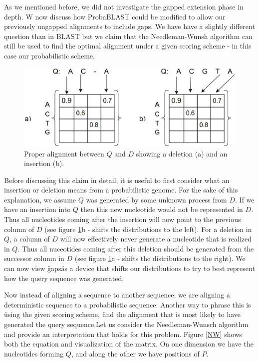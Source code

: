 \documentclass[10pt]{IEEEtran}
\begin{document}
As we mentioned before, we did not investigate the gapped extension phase in depth. W now discuss how ProbaBLAST could be modified to allow our previously ungapped alignments to include gaps. We have have a slightly different question than in BLAST but we claim that the Needleman-Wunsh algorithm can still be used to find the optimal alignment under a given scoring scheme - in this case our probabilistic scheme.

\begin{figure}
    \centering
    \includegraphics[scale=0.5]{indel}
    \caption{Proper alignment between $Q$ and $D$ showing a deletion (a) and an insertion (b).}
    \label{indel}
\end{figure}

Before discussing this claim in detail, it is useful to first consider what an insertion or deletion means from a probabilistic genome. For the sake of this explanation, we assume $Q$ was generated by some unknown process from $D$. If we have an insertion into $Q$ then this new nucleotide would not be represented in $D$. Thus all nucleotides coming after the insertion will now point to the previous column of $D$ (see figure \ref{indel}b - shifts the distributions to the left). For a deletion in $Q$, a column of $D$ will now effectively never generate a nucleotide that is realized in $Q$. Thus all nuceotides coming after this deletion should be generated from the successor column in $D$ (see figure \ref{indel}a - shifts the distributions to the right). We can now view \"gaps\" as a device that shifts our distributions to try to best represent how the query sequence was generated.

Now instead of aligning a sequence to another sequence, we are aligning a deterministic sequence to a probabilistic sequence. Another way to phrase this is \"using the given scoring scheme, find the alignment that is most likely to have generated the query sequence.\" Let us consider the Needleman-Wunsch algorithm and provide an interpretation that holds for this problem. Figure \ref{NW} shows both the equation and visualization of the matrix. On one dimension we have the nucleotides forming $Q$, and along the other we have positions of $P$. 
\end{document}
